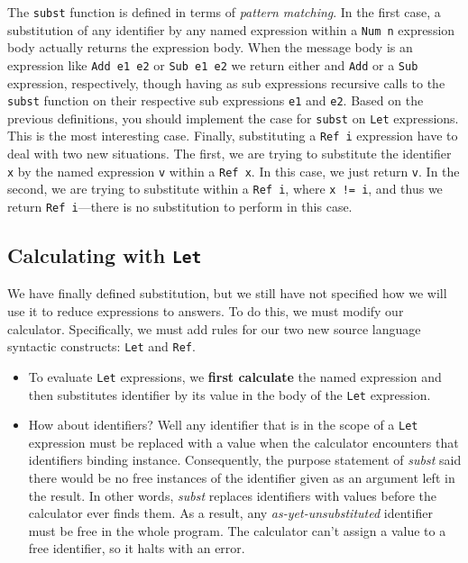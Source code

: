 \documentclass{book}
\renewcommand{\emph}[1]{{\color{blue}\textit{#1}}}
\begin{document}
The \texttt{subst} function is defined in terms of 
\emph{pattern matching}. In the first case, a substitution 
of any identifier by any named expression within 
a \texttt{Num n} expression body actually returns 
the expression body. When the message body 
is an expression like \texttt{Add e1 e2} or 
\texttt{Sub e1 e2} we return either and \texttt{Add} 
or a \texttt{Sub} expression, respectively, though 
having as sub expressions recursive calls to the 
\texttt{subst} function on their respective 
sub expressions \texttt{e1} and \texttt{e2}. Based on 
the previous definitions, you should implement 
the case for \texttt{subst} on \texttt{Let} expressions. 
This is the most interesting case. Finally, 
substituting a \texttt{Ref i} expression have 
to deal with two new situations. The first, 
we are trying to substitute the identifier \texttt{x} 
by the named expression \texttt{v} within a \texttt{Ref x}. 
In this case, we just return \texttt{v}. In the second, 
we are trying to substitute within a \texttt{Ref i}, where 
\texttt{x != i}, and thus we return \texttt{Ref i}---there 
is no substitution to perform in this case. 

\subsection{Calculating with \texttt{Let}}

We have finally defined substitution, but we still 
have not specified how we will use it to reduce 
expressions to answers. To do this, we must 
modify our calculator. Specifically, we must add 
rules for our two new source language syntactic 
constructs: \texttt{Let} and \texttt{Ref}. 

\begin{itemize}
\item To evaluate \texttt{Let} expressions, we {\bf first calculate} the 
named expression and then substitutes identifier by its value 
in the body of the \texttt{Let} 
expression. 

\item How about identifiers? Well any identifier that is in the scope of 
a \texttt{Let} expression must be replaced with a value when the 
calculator encounters that identifiers binding instance. Consequently, 
the purpose statement of \emph{subst} said there would be no free 
instances of the identifier given as an argument left in the 
result. In other words, \emph{subst} replaces identifiers with 
values before the calculator ever finds them. As a result, any 
\emph{as-yet-unsubstituted} identifier must be free in the whole 
program. The calculator can't assign a value to a free identifier, 
so it halts with an error. 
\end{itemize}
\end{document}
